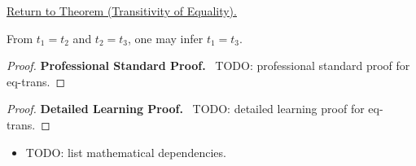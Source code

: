 \newpage
{}
\label{prf:eq-trans}

\begin{remark*}[Return]
\hyperref[thm:eq-trans]{Return to Theorem (Transitivity of Equality).}
\end{remark*}

\begin{theorem*}
From $t_1 = t_2$ and $t_2 = t_3$, one may infer $t_1 = t_3$.
\end{theorem*}

\begin{proof}
\textbf{Professional Standard Proof.}~
TODO: professional standard proof for eq-trans.
\end{proof}

\begin{proof}
\textbf{Detailed Learning Proof.}~
TODO: detailed learning proof for eq-trans.
\end{proof}

\begin{remark*}
\end{remark*}

\begin{dependencies}
\begin{itemize}
  \item TODO: list mathematical dependencies.
\end{itemize}
\end{dependencies}

\clearpage
